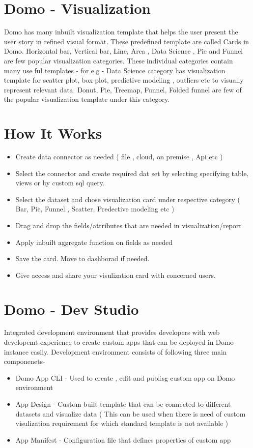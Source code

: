 \section{Domo - Visualization}

Domo has many inbuilt visualization template that helps the 
user present the user story in refined visual format.
These predefined template are called Cards in Domo. Horizontal bar, 
Vertical bar, Line, Area , Data Science , Pie and Funnel are 
few popular visualization categories. These individual categories 
contain many use ful templates - for e.g - Data Science category 
has visualization template for scatter plot, box plot, predictive 
modeling , outliers etc to visually represent relevant data. 
Donut, Pie, Treemap, Funnel, Folded funnel are few of the
popular visualization template under this category.



\section{How It Works}
\begin{itemize}
\item Create data connector as needed 
( file , cloud, on premise , Api etc )
\item Select the connector and create required dat set by 
selecting specifying table, views or by custom sql query.
\item Select the dataset and chose visualization card under 
respective category ( Bar, Pie, Funnel , Scatter, 
Predective modeling etc )
\item Drag and drop the fields/attributes that are needed 
in visualization/report 
\item Apply inbuilt aggregate function on fields as needed 
\item Save the card. Move to dashborad if needed.
\item Give access and share your visulization card with concerned users.

\end{itemize}

\section{Domo - Dev Studio}

Integrated development environment that provides developers 
with web developemt experience to create custom apps that 
can be deployed in Domo instance easily. Development environment 
consists of following three main componenets-
\begin{itemize}
\item Domo App CLI - Used to create , edit and publisg custom app 
on Domo environment
\item App Design - Custom built template that can be connected to 
different datasets and visualize data ( This can be used when 
there is need of custom visulization requirement for which 
standard template is not available )
\item App Manifest - Configuration file that defines properties 
of custom app
\end{itemize}

